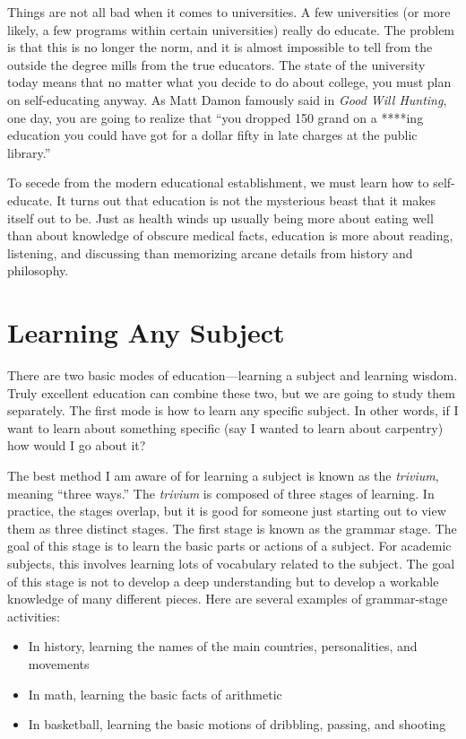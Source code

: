 Things are not all bad when it comes to universities. A few universities
(or more likely, a few programs within certain universities) really do
educate. The problem is that this is no longer the norm, and it is
almost impossible to tell from the outside the degree mills from the
true educators. The state of the university today means that no matter
what you decide to do about college, you must plan on self-educating
anyway. As Matt Damon famously said in \textit{Good Will Hunting}, one
day, you are going to realize that “you dropped 150 grand on a ****ing
education you could have got for a dollar fifty in late charges at the
public library.”

To secede from the modern educational establishment, we must learn how
to self-educate. It turns out that education is not the mysterious
beast that it makes itself out to be. Just as health winds up usually
being more about eating well than about knowledge of obscure medical
facts, education is more about reading, listening, and discussing than
memorizing arcane details from history and philosophy.

\section{Learning Any Subject}

There are two basic modes of education—learning a subject and learning
wisdom. Truly excellent education can combine these two, but we are
going to study them separately. The first mode is how to learn any
specific subject. In other words, if I want to learn about something
specific (say I
wanted to learn about
carpentry) how would
I go about it?  

The best method I am aware of for learning a subject is known as the
\textit{trivium}, meaning “three ways.”  The \textit{trivium} is
composed of three stages of learning. In practice, the stages overlap,
but it is good for someone just starting out to view them as three
distinct stages. The first stage is known as the grammar stage. The
goal of this stage is to learn the basic parts or actions of a subject.
For academic subjects, this involves learning lots of vocabulary
related to the subject. The goal of this stage is not to develop a deep
understanding but to develop a workable knowledge of many different
pieces. Here are several examples of grammar-stage activities:

\begin{itemize}
\item 
In history, learning the names of the main countries, personalities, and
movements
\item 
In math, learning the basic facts of arithmetic
\item 
In basketball, learning the basic motions of dribbling, passing, and
shooting
\end{itemize}

